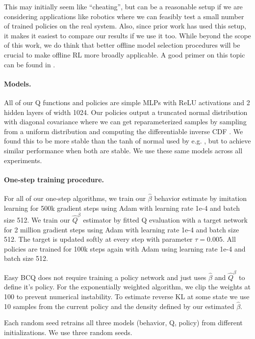 \begin{subappendices}
This may initially seem like ``cheating'', but can be a reasonable setup if we are considering applications like robotics where we can feasibly test a small number of trained policies on the real system. Also, since prior work has used this setup, it makes it easiest to compare our results if we use it too. While beyond the scope of this work, we do think that better offline model selection procedures will be crucial to make offline RL more broadly applicable. A good primer on this topic can be found in \cite{paine2020hyperparameter}.


\paragraph{Models.} All of our Q functions and policies are simple MLPs with ReLU activations and 2 hidden layers of width 1024. Our policies output a truncated normal distribution with diagonal covariance where we can get reparameterized samples by sampling from a uniform distribution and computing the differentiable inverse CDF \citep{Burkhardt2014truncated}. We found this to be more stable than the tanh of normal used by e.g. \cite{fu2020d4rl}, but to achieve similar performance when both are stable. We use these same models across all experiments.


\paragraph{One-step training procedure.} For all of our one-step algorithms, we train our $ \hat \beta $ behavior estimate by imitation learning for 500k gradient steps using Adam \citep{kingma2014adam} with learning rate 1e-4 and batch size 512. We train our $ \widehat Q^\beta$ estimator by fitted Q evaluation with a target network for 2 million gradient steps using Adam with learning rate 1e-4 and batch size 512. The target is updated softly at every step with parameter $ \tau = 0.005$. All policies are trained for 100k steps again with Adam using learning rate 1e-4 and batch size 512.

Easy BCQ does not require training a policy network and just uses $ \hat \beta$ and $ \widehat Q^\beta$ to define it's policy. For the exponentially weighted algorithm, we clip the weights at 100 to prevent numerical instability. To estimate reverse KL at some state we use 10 samples from the current policy and the density defined by our estimated $ \hat \beta$.

Each random seed retrains all three models (behavior, Q, policy) from different initializations. We use three random seeds.


\end{subappendices}
